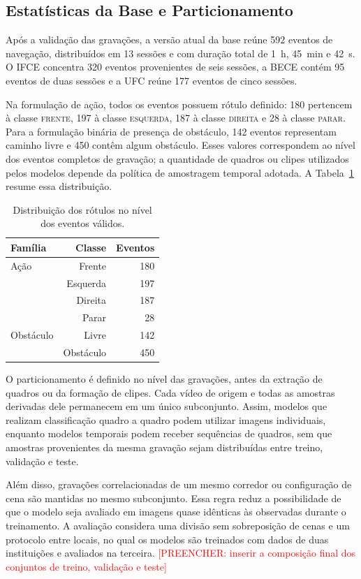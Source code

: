 \documentclass[conference]{IEEEtran}
\newcommand{\todo}[1]{\textcolor{red}{[PREENCHER: #1]}}
\begin{document}
\subsection{Estatísticas da Base e Particionamento}

Após a validação das gravações, a versão atual da base reúne 592 eventos de navegação, distribuídos em 13 sessões e com duração total de 1~h, 45~min e 42~s. O IFCE concentra 320 eventos provenientes de seis sessões, a BECE contém 95 eventos de duas sessões e a UFC reúne 177 eventos de cinco sessões.

Na formulação de ação, todos os eventos possuem rótulo definido: 180 pertencem à classe \textsc{frente}, 197 à classe \textsc{esquerda}, 187 à classe \textsc{direita} e 28 à classe \textsc{parar}. Para a formulação binária de presença de obstáculo, 142 eventos representam caminho livre e 450 contêm algum obstáculo. Esses valores correspondem ao nível dos eventos completos de gravação; a quantidade de quadros ou clipes utilizados pelos modelos depende da política de amostragem temporal adotada. A Tabela~\ref{tab:stats} resume essa distribuição.

\begin{table}[t]
\caption{Distribuição dos rótulos no nível dos eventos válidos.}
\label{tab:stats}
\centering
\scriptsize
\begin{tabular}{lrr}
\toprule
Família & Classe & Eventos \\
\midrule
Ação & Frente & 180 \\
     & Esquerda & 197 \\
     & Direita & 187 \\
     & Parar & 28 \\
\midrule
Obstáculo & Livre & 142 \\
          & Obstáculo & 450 \\
\bottomrule
\end{tabular}
\end{table}

O particionamento é definido no nível das gravações, antes da extração de quadros ou da formação de clipes. Cada vídeo de origem e todas as amostras derivadas dele permanecem em um único subconjunto. Assim, modelos que realizam classificação quadro a quadro podem utilizar imagens individuais, enquanto modelos temporais podem receber sequências de quadros, sem que amostras provenientes da mesma gravação sejam distribuídas entre treino, validação e teste.

Além disso, gravações correlacionadas de um mesmo corredor ou configuração de cena são mantidas no mesmo subconjunto. Essa regra reduz a possibilidade de que o modelo seja avaliado em imagens quase idênticas às observadas durante o treinamento. A avaliação considera uma divisão sem sobreposição de cenas e um protocolo entre locais, no qual os modelos são treinados com dados de duas instituições e avaliados na terceira. \todo{inserir a composição final dos conjuntos de treino, validação e teste}
\end{document}
